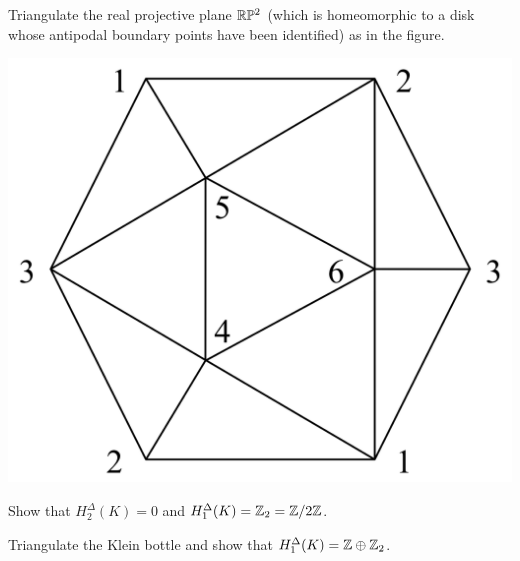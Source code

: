 \begin{xca}
    Triangulate the real projective plane $\mathbb{R}\mathbb{P}^2$ (which is homeomorphic to a disk whose antipodal boundary points have been identified) as in the figure.
    \begin{center}
        \includegraphics[scale=0.2]{figures/projectiveplane.png}
    \end{center}
    Show that $H^\Delta_2(K)=0$ and $H^\Delta_1(K)=\mathbb{Z}_2=\mathbb{Z}/2\mathbb{Z}$.
\end{xca}
\begin{xca}
    Triangulate the Klein bottle and show that $H^\Delta_1(K)=\mathbb{Z}\oplus\mathbb{Z}_2$.
\end{xca}


